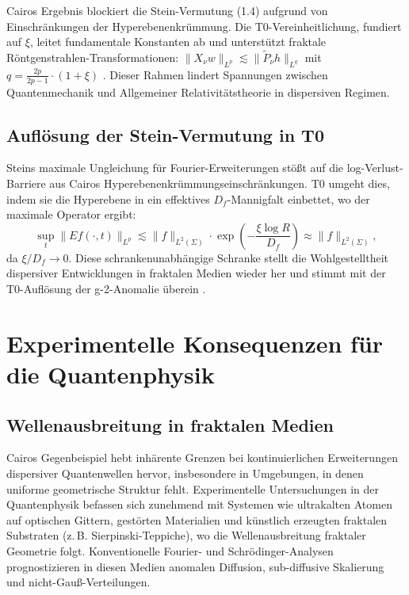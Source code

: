 	Cairos Ergebnis blockiert die Stein-Vermutung (1.4) aufgrund von Einschränkungen der Hyperebenenkrümmung. Die T0-Vereinheitlichung, fundiert auf $\xi$, leitet fundamentale Konstanten ab und unterstützt fraktale Röntgenstrahlen-Transformationen: $\|X_\nu w\|_{L^p} \lesssim \|\tilde{P}_\nu h\|_{L^q}$ mit $q = \frac{2p}{2p-1} \cdot (1 + \xi)$ \cite{T0_netze_en}. Dieser Rahmen lindert Spannungen zwischen Quantenmechanik und Allgemeiner Relativitätstheorie in dispersiven Regimen.
	
	\subsection{Auflösung der Stein-Vermutung in T0}
	
	Steins maximale Ungleichung für Fourier-Erweiterungen stößt auf die log-Verlust-Barriere aus Cairos Hyperebenenkrümmungseinschränkungen. T0 umgeht dies, indem sie die Hyperebene in ein effektives $D_f$-Mannigfalt einbettet, wo der maximale Operator ergibt:
	\begin{equation}
		\sup_t \|Ef(\cdot, t)\|_{L^p} \lesssim \|f\|_{L^2(\Sigma)} \cdot \exp\left(-\frac{\xi \log R}{D_f}\right) \approx \|f\|_{L^2(\Sigma)},
	\end{equation}
	da $\xi / D_f \to 0$. Diese schrankenunabhängige Schranke stellt die Wohlgestelltheit dispersiver Entwicklungen in fraktalen Medien wieder her und stimmt mit der T0-Auflösung der g-2-Anomalie überein \cite{T0_g2_erweiterung}.
	
	\section{Experimentelle Konsequenzen für die Quantenphysik}
	
	\subsection{Wellenausbreitung in fraktalen Medien}
	
	Cairos Gegenbeispiel hebt inhärente Grenzen bei kontinuierlichen Erweiterungen dispersiver Quantenwellen hervor, insbesondere in Umgebungen, in denen uniforme geometrische Struktur fehlt. Experimentelle Untersuchungen in der Quantenphysik befassen sich zunehmend mit Systemen wie ultrakalten Atomen auf optischen Gittern, gestörten Materialien und künstlich erzeugten fraktalen Substraten (z.\,B. Sierpinski-Teppiche), wo die Wellenausbreitung fraktaler Geometrie folgt. Konventionelle Fourier- und Schrödinger-Analysen prognostizieren in diesen Medien anomalen Diffusion, sub-diffusive Skalierung und nicht-Gauß-Verteilungen.
	

